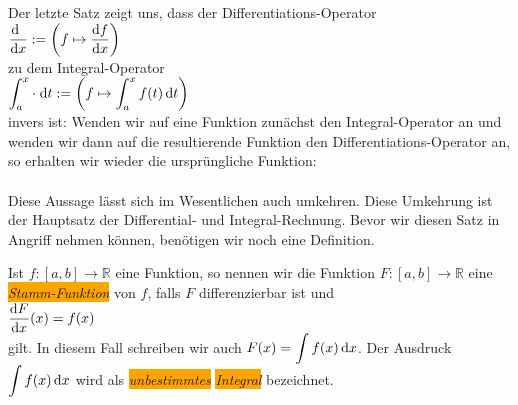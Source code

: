 \remark
Der letzte Satz zeigt uns, dass der Differentiations-Operator
\\[0.2cm]
\hspace*{1.3cm}
$\displaystyle\frac{\textrm{d}\,\;}{\textrm{d}x} := \left(f \mapsto \frac{\textrm{d}f}{\textrm{d}x} \right)$ 
\\[0.2cm]
zu dem Integral-Operator
\\[0.2cm]
\hspace*{1.3cm}
$\displaystyle\int_{a}^x \cdot \;\textrm{d} t := \left(f \mapsto \int_a^x f(t) \, \textrm{d} t\right)$ 
\\[0.2cm]
invers ist: Wenden wir auf eine Funktion zun\"achst den
Integral-Operator an und wenden wir dann auf die resultierende Funktion den
Differentiations-Operator an, so erhalten wir wieder die urspr\"ungliche Funktion:
\\[0.2cm]
\hspace*{1.3cm}
\colorbox{red}{\colorbox{orange}{}}
\\[0.2cm]
Diese Aussage
l\"asst sich im Wesentlichen auch umkehren.  Diese Umkehrung ist der Hauptsatz der Differential- und
Integral-Rechnung.  Bevor wir diesen Satz in Angriff nehmen k\"onnen, ben\"otigen wir noch eine Definition.
\pagebreak

\begin{Definition} \lb
Ist $f:[a,b] \rightarrow \mathbb{R}$ eine Funktion, so nennen wir die Funktion  $F:[a,b]\rightarrow\mathbb{R}$ 
eine \colorbox{orange}{\emph{Stamm-Funktion}} von $f$, falls $F$ differenzierbar ist und 
\\[0.2cm]
\hspace*{1.3cm} $\displaystyle\frac{\textrm{d}F}{\textrm{d}x}(x) = f(x)$
\\[0.2cm]
gilt.  In diesem Fall schreiben wir auch  $\displaystyle F(x) = \int f(x) \, \textrm{d} x$.
Der Ausdruck $\displaystyle\int f(x) \, \textrm{d} x$ wird als \colorbox{orange}{\emph{unbestimmtes}} 
\colorbox{orange}{\emph{Integral}} bezeichnet. \eod
\end{Definition}

